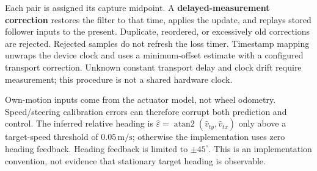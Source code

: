 Each pair is assigned its capture midpoint. A \textbf{delayed-measurement correction} restores the filter to that time, applies the update, and replays stored follower inputs to the present. Duplicate, reordered, or excessively old corrections are rejected. Rejected samples do not refresh the loss timer. Timestamp mapping unwraps the device clock and uses a minimum-offset estimate with a configured transport correction. Unknown constant transport delay and clock drift require measurement; this procedure is not a shared hardware clock.

Own-motion inputs come from the actuator model, not wheel odometry. Speed/steering calibration errors can therefore corrupt both prediction and control. The inferred relative heading is $\hat\varepsilon=\operatorname{atan2}(\hat v_{ty},\hat v_{tx})$ only above a target-speed threshold of $0.05\,\mathrm{m/s}$; otherwise the implementation uses zero heading feedback. Heading feedback is limited to $\pm45^\circ$. This is an implementation convention, not evidence that stationary target heading is observable.


